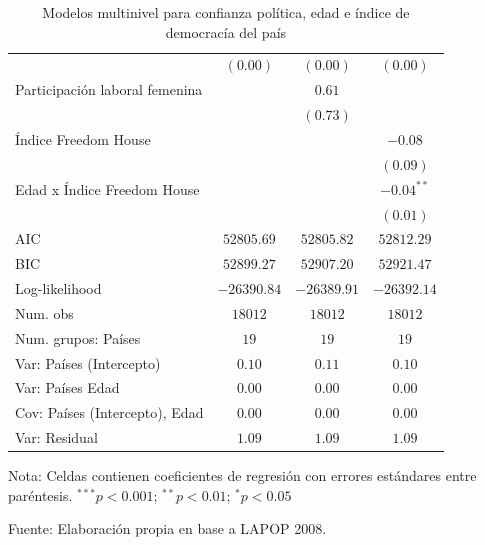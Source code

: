 \documentclass[
  12pt,
  a4paper,
]{article}
\begin{document}
\begin{table}[h!]
\begin{center}
{\begin{threeparttable}
\begin{tabular}{l c c c}
                               & $(0.00)$      & $(0.00)$      & $(0.00)$      \\
Participación laboral femenina &               & $0.61$        &               \\
                               &               & $(0.73)$      &               \\
Índice Freedom House           &               &               & $-0.08$       \\
                               &               &               & $(0.09)$      \\
Edad x Índice Freedom House    &               &               & $-0.04^{**}$  \\
                               &               &               & $(0.01)$      \\
\midrule
AIC                            & $52805.69$    & $52805.82$    & $52812.29$    \\
BIC                            & $52899.27$    & $52907.20$    & $52921.47$    \\
Log-likelihood                 & $-26390.84$   & $-26389.91$   & $-26392.14$   \\
Num. obs                       & $18012$       & $18012$       & $18012$       \\
Num. grupos: Países            & $19$          & $19$          & $19$          \\
Var: Países (Intercepto)       & $0.10$        & $0.11$        & $0.10$        \\
Var: Países Edad               & $0.00$        & $0.00$        & $0.00$        \\
Cov: Países (Intercepto), Edad & $0.00$        & $0.00$        & $0.00$        \\
Var: Residual                  & $1.09$        & $1.09$        & $1.09$        \\
\bottomrule
\end{tabular}
\begin{tablenotes}[flushleft]
\scriptsize{\item Nota: Celdas contienen coeficientes de regresión con errores estándares entre paréntesis. $^{***}p<0.001$; $^{**}p<0.01$; $^{*}p<0.05$ \\ \item Fuente: Elaboración propia en base a LAPOP 2008.}
\end{tablenotes}
\end{threeparttable}
}
\caption{\label{tab:table2} Modelos multinivel para confianza política, edad e índice de democracía del país}
\label{table:coefficients}
\end{center}
\end{table}
\end{document}
